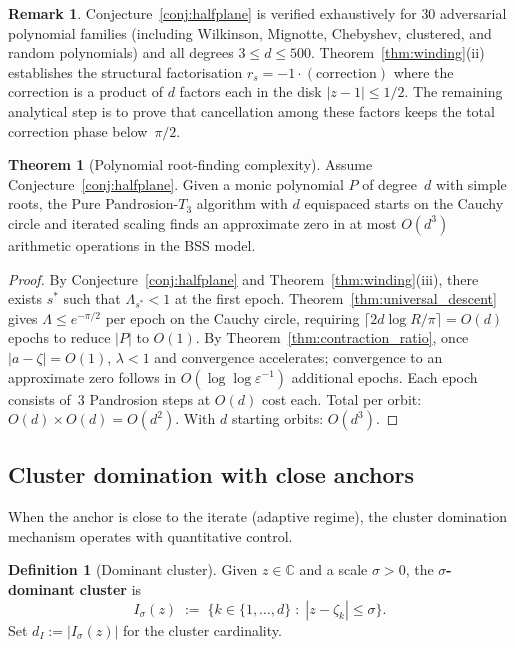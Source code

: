 \documentclass[11pt,a4paper]{article}
\theoremstyle{definition}
\newtheorem{definition}{Definition}[section]
\newtheorem{theorem}{Theorem}[section]
\newtheorem{remark}{Remark}[section]
\newcommand{\CC}{\mathbb{C}}
\begin{document}
\begin{remark}
Conjecture~\ref{conj:halfplane} is verified exhaustively for $30$ adversarial polynomial families (including Wilkinson, Mignotte, Chebyshev, clustered, and random polynomials) and all degrees $3 \leq d \leq 500$.  Theorem~\ref{thm:winding}(ii) establishes the structural factorisation $r_s = -1 \cdot (\text{correction})$ where the correction is a product of $d$ factors each in the disk $|z-1| \leq 1/2$.  The remaining analytical step is to prove that cancellation among these factors keeps the total correction phase below~$\pi/2$.
\end{remark}

\begin{theorem}[Polynomial root-finding complexity]
\label{thm:main}
Assume Conjecture~\ref{conj:halfplane}.  Given a monic polynomial $P$ of degree~$d$ with simple roots, the Pure Pandrosion-$T_3$ algorithm with $d$ equispaced starts on the Cauchy circle and iterated scaling finds an approximate zero in at most $O(d^3)$ arithmetic operations in the BSS model.
\end{theorem}

\begin{proof}
By Conjecture~\ref{conj:halfplane} and Theorem~\ref{thm:winding}(iii), there exists $s^*$ such that $\Lambda_{s^*} < 1$ at the first epoch.  Theorem~\ref{thm:universal_descent} gives $\Lambda \leq e^{-\pi/2}$ per epoch on the Cauchy circle, requiring $\lceil 2d\log R/\pi\rceil = O(d)$ epochs to reduce $|P|$ to $O(1)$.  By Theorem~\ref{thm:contraction_ratio}, once $|a-\zeta| = O(1)$, $\lambda < 1$ and convergence accelerates; convergence to an approximate zero follows in $O(\log\log\varepsilon^{-1})$ additional epochs.  Each epoch consists of~$3$ Pandrosion steps at $O(d)$ cost each.  Total per orbit: $O(d) \times O(d) = O(d^2)$.  With $d$ starting orbits: $O(d^3)$.
\end{proof}

\subsection{Cluster domination with close anchors}
\label{sec:cluster_domination}

When the anchor is close to the iterate (adaptive regime), the cluster domination mechanism operates with quantitative control.

\begin{definition}[Dominant cluster]
\label{def:dominant_cluster}
Given $z \in \CC$ and a scale $\sigma > 0$, the \textbf{$\sigma$-dominant cluster} is
\[
  I_\sigma(z) \;:=\; \bigl\{k \in \{1,\ldots,d\} \;:\; |z - \zeta_k| \leq \sigma\bigr\}.
\]
Set $d_I := |I_\sigma(z)|$ for the cluster cardinality.
\end{definition}
\end{document}
